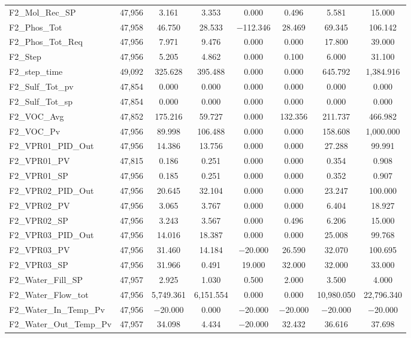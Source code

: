 \begin{table}[!htbp]
{\begin{tabular}{@{\extracolsep{5pt}}lccccccc}
F2\_Mol\_Rec\_SP & 47,956 & 3.161 & 3.353 & 0.000 & 0.496 & 5.581 & 15.000 \\ 
F2\_Phos\_Tot & 47,958 & 46.750 & 28.533 & $-$112.346 & 28.469 & 69.345 & 106.142 \\ 
F2\_Phos\_Tot\_Req & 47,956 & 7.971 & 9.476 & 0.000 & 0.000 & 17.800 & 39.000 \\ 
F2\_Step & 47,956 & 5.205 & 4.862 & 0.000 & 0.100 & 6.000 & 31.100 \\ 
F2\_step\_time & 49,092 & 325.628 & 395.488 & 0.000 & 0.000 & 645.792 & 1,384.916 \\ 
F2\_Sulf\_Tot\_pv & 47,854 & 0.000 & 0.000 & 0.000 & 0.000 & 0.000 & 0.000 \\ 
F2\_Sulf\_Tot\_sp & 47,854 & 0.000 & 0.000 & 0.000 & 0.000 & 0.000 & 0.000 \\ 
F2\_VOC\_Avg & 47,852 & 175.216 & 59.727 & 0.000 & 132.356 & 211.737 & 466.982 \\ 
F2\_VOC\_Pv & 47,956 & 89.998 & 106.488 & 0.000 & 0.000 & 158.608 & 1,000.000 \\ 
F2\_VPR01\_PID\_Out & 47,956 & 14.386 & 13.756 & 0.000 & 0.000 & 27.288 & 99.991 \\ 
F2\_VPR01\_PV & 47,815 & 0.186 & 0.251 & 0.000 & 0.000 & 0.354 & 0.908 \\ 
F2\_VPR01\_SP & 47,956 & 0.185 & 0.251 & 0.000 & 0.000 & 0.352 & 0.907 \\ 
F2\_VPR02\_PID\_Out & 47,956 & 20.645 & 32.104 & 0.000 & 0.000 & 23.247 & 100.000 \\ 
F2\_VPR02\_PV & 47,956 & 3.065 & 3.767 & 0.000 & 0.000 & 6.404 & 18.927 \\ 
F2\_VPR02\_SP & 47,956 & 3.243 & 3.567 & 0.000 & 0.496 & 6.206 & 15.000 \\ 
F2\_VPR03\_PID\_Out & 47,956 & 14.016 & 18.387 & 0.000 & 0.000 & 25.008 & 99.768 \\ 
F2\_VPR03\_PV & 47,956 & 31.460 & 14.184 & $-$20.000 & 26.590 & 32.070 & 100.695 \\ 
F2\_VPR03\_SP & 47,956 & 31.966 & 0.491 & 19.000 & 32.000 & 32.000 & 33.000 \\ 
F2\_Water\_Fill\_SP & 47,957 & 2.925 & 1.030 & 0.500 & 2.000 & 3.500 & 4.000 \\ 
F2\_Water\_Flow\_tot & 47,956 & 5,749.361 & 6,151.554 & 0.000 & 0.000 & 10,980.050 & 22,796.340 \\ 
F2\_Water\_In\_Temp\_Pv & 47,956 & $-$20.000 & 0.000 & $-$20.000 & $-$20.000 & $-$20.000 & $-$20.000 \\ 
F2\_Water\_Out\_Temp\_Pv & 47,957 & 34.098 & 4.434 & $-$20.000 & 32.432 & 36.616 & 37.698 \\ 

\end{tabular}}
\end{table}
